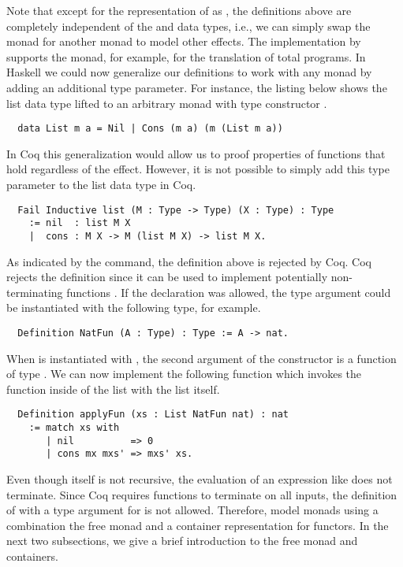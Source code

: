 Note that except for the representation of  as , the definitions above are completely independent of the  and  data types, i.e., we can simply swap the  monad for another monad to model other effects.
The implementation by \cite{Jessen:2019} supports the  monad, for example, for the translation of total programs.
In Haskell we could now generalize our definitions to work with any monad by adding an additional type parameter.
For instance, the listing below shows the list data type lifted to an arbitrary monad with type constructor .

\begin{verbatim}
  data List m a = Nil | Cons (m a) (m (List m a))
\end{verbatim}

In Coq this generalization would allow us to proof properties of functions that hold regardless of the effect.
However, it is not possible to simply add this type parameter to the list data type in Coq.

\begin{verbatim}
  Fail Inductive list (M : Type -> Type) (X : Type) : Type
    := nil  : list M X
    |  cons : M X -> M (list M X) -> list M X.
\end{verbatim}

As indicated by the  command, the definition above is rejected by Coq.
Coq rejects the definition since it can be used to implement potentially non-terminating functions \citep[p.~6]{Dylus:2018}.
If the declaration was allowed, the type argument  could be instantiated with the following type, for example.

\begin{verbatim}
  Definition NatFun (A : Type) : Type := A -> nat.
\end{verbatim}

When  is instantiated with , the second argument of the  constructor is a function of type .
We can now implement the following function which invokes the function inside of the list with the list itself.

\begin{verbatim}
  Definition applyFun (xs : List NatFun nat) : nat
    := match xs with
       | nil          => 0
       | cons mx mxs' => mxs' xs.
\end{verbatim}

Even though  itself is not recursive, the evaluation of an expression like  does not terminate.
Since Coq requires functions to terminate on all inputs, the definition of  with a type argument for  is not allowed.
Therefore, \cite{Dylus:2018} model monads using a combination the free monad and a container representation for functors.
In the next two subsections, we give a brief introduction to the free monad and containers.

